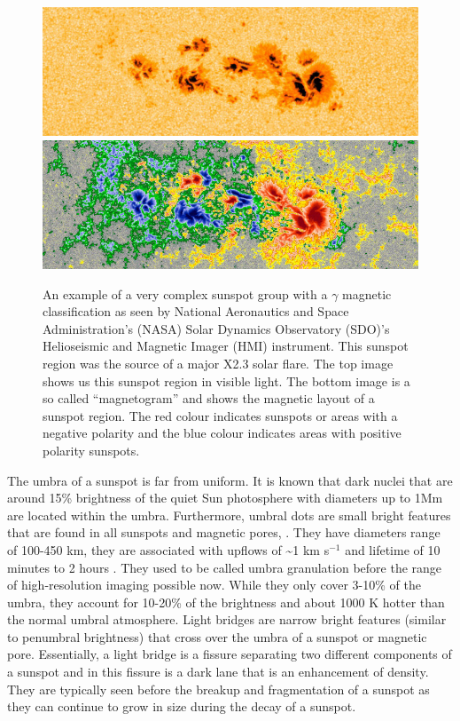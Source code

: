 	\begin{figure}
		\centering
		\includegraphics[width=\textwidth]{sunspot.jpg}\\
		\includegraphics[width=\textwidth]{sunspot_magnetic.jpg}\\
		\caption{
			An example of a very complex sunspot group with a $\gamma$ magnetic classification as seen by National Aeronautics and Space Administration's (NASA) Solar Dynamics Observatory (SDO)'s Helioseismic and Magnetic Imager (HMI) instrument.
			This sunspot region was the source of a major X2.3 solar flare.
			The top image shows us this sunspot region in visible light.
			The bottom image is a so called ``magnetogram'' and shows the magnetic layout of a sunspot region.
			The red colour indicates sunspots or areas with a negative polarity and the blue colour indicates areas with positive polarity sunspots.	
		}
		\label{fig:AR_Mag}
	\end{figure}
		
	The umbra of a sunspot is far from uniform.
	It is known that dark nuclei that are around 15\% brightness of the quiet Sun photosphere with diameters up to 1Mm are located within the umbra.
	Furthermore, umbral dots are small bright features that are found in all sunspots and magnetic pores, \cite{1950Obs....70..234T,1964ApJ...139...45D}.
	They have diameters range of 100-450 km, they are associated with upflows of \textasciitilde1 km s$^{-1}$ and lifetime of 10 minutes to 2 hours \citep{1997A&A...328..682S,1997A&A...328..689S}.
	They used to be called umbra granulation before the range of high-resolution imaging possible now.
	While they only cover 3-10\% of the umbra, they account for 10-20\% of the brightness and about 1000 K hotter than the normal umbral atmosphere.
	Light bridges are narrow bright features (similar to penumbral brightness) that cross over the umbra of a sunspot or magnetic pore.
	Essentially, a light bridge is a fissure separating two different components of a sunspot and in this fissure is a dark lane that is an enhancement of density.
	They are typically seen before the breakup and fragmentation of a sunspot as they can continue to grow in size during the decay of a sunspot.
	
